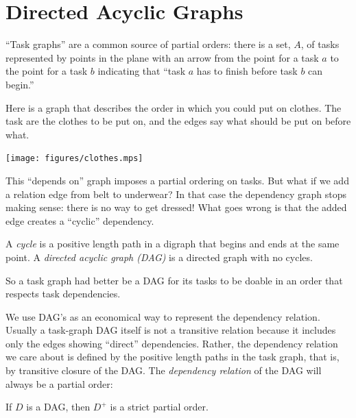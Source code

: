\iffalse

\section{Directed Acyclic Graphs}\label{sec:dag}

``Task graphs'' are a common source of partial orders: there is a set,
$A$, of tasks represented by points in the plane with an arrow from the
point for a task $a$ to the point for a task $b$ indicating that ``task
$a$ has to finish before task $b$ can begin.''

\begin{samepage}
\begin{example}\label{cloth}
Here is a graph that describes the order in which you could put on clothes.
The task are the clothes to be put on, and the edges say what should be put
on before what.
\begin{center}\texttt{[image: figures/clothes.mps]}\end{center}
\end{example}
\end{samepage}

This ``depends on'' graph imposes a partial ordering on tasks.  But what
if we add a relation edge from belt to underwear?  In that case the
dependency graph stops making sense: there is no way to get dressed!  What
goes wrong is that the added edge creates a ``cyclic'' dependency.

\begin{definition}
A \emph{cycle} is a positive length path in a digraph that begins and ends
at the same point.  A \emph{directed acyclic graph (DAG)} is a directed
graph with no cycles.
\end{definition}

So a task graph had better be a DAG for its tasks to be doable in an order
that respects task dependencies.

We use DAG's as an economical way to represent the dependency relation.
Usually a task-graph DAG itself is not a transitive relation because it
includes only the edges showing ``direct'' dependencies.  Rather, the
dependency relation we care about is defined by the positive length paths
in the task graph, that is, by transitive closure of the DAG.  The
\emph{dependency relation} of the DAG will always be a partial order:

\begin{lemma}
If $D$ is a DAG, then $D^+$ is a strict partial order.
\end{lemma}

